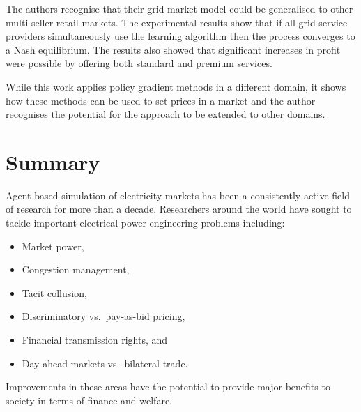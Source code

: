 The authors recognise that their grid market model could be generalised to other
multi-seller retail markets.  The experimental results show that if all grid
service providers simultaneously use the learning algorithm then the process
converges to a Nash equilibrium.  The results also showed that significant
increases in profit were possible by offering both standard and premium
services.

While this work applies policy gradient methods in a different domain, it shows
how these methods can be used to set prices in a market and the author
recognises the potential for the approach to be extended to other domains.



\section{Summary}
Agent-based simulation of electricity markets has been a consistently active
field of research for more than a decade.  Researchers around the world have
sought to tackle important electrical power engineering problems including:
\begin{itemize}
  \item Market power,
  \item Congestion management,
  \item Tacit collusion,
  \item Discriminatory vs.~pay-as-bid pricing,
  \item Financial transmission rights, and
  \item Day ahead markets vs.~bilateral trade.
\end{itemize}
Improvements in these areas have the potential to provide major benefits to
society in terms of finance and welfare.

